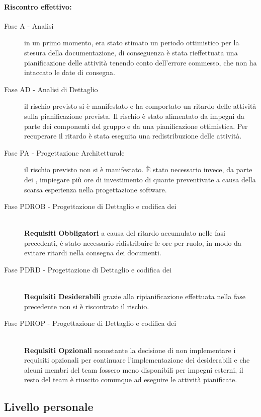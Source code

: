 \documentclass[../PianoProgetto.tex]{subfiles}
\begin{document}
	\paragraph*{Riscontro effettivo:} 
		\begin{description}
			\item[Fase A - Analisi] in un primo momento, era stato stimato un periodo ottimistico per la stesura della documentazione, di conseguenza è stata rieffettuata una pianificazione delle attività tenendo conto dell'errore commesso, che non ha intaccato le date di consegna.
			\item[Fase AD - Analisi di Dettaglio] il rischio previsto si è manifestato e ha comportato un ritardo delle attività sulla pianificazione prevista. Il rischio è stato alimentato da impegni da parte dei componenti del gruppo e da una pianificazione ottimistica. Per recuperare il ritardo è stata eseguita una redistribuzione delle attività.
			\item[Fase PA - Progettazione Architetturale] il rischio previsto non si è manifestato. È stato necessario invece, da parte dei \progettisti, impiegare più ore di investimento di quante preventivate a causa della scarsa esperienza nella progettazione software\g.
			\item[Fase PDROB - Progettazione di Dettaglio e codifica dei]  \ \\
					\textbf{Requisiti Obbligatori} a causa del ritardo accumulato nelle fasi precedenti, è stato necessario ridistribuire le ore per ruolo, in modo da evitare ritardi nella consegna dei documenti.
			\item[Fase PDRD - Progettazione di Dettaglio e codifica dei] \ \\
					\textbf{Requisiti Desiderabili} grazie alla ripianificazione effettuata nella fase precedente non si è riscontrato il rischio.
			\item[Fase PDROP - Progettazione di Dettaglio e codifica dei]  \ \\
					\textbf{Requisiti Opzionali} nonostante la decisione di non implementare i requisiti opzionali per continuare l'implementazione dei desiderabili e che alcuni membri del team fossero meno disponibili per impegni esterni, il resto del team è riuscito comunque ad eseguire le attività pianificate.
		\end{description}
		

\newpage
\subsection{Livello personale}
\end{document}
